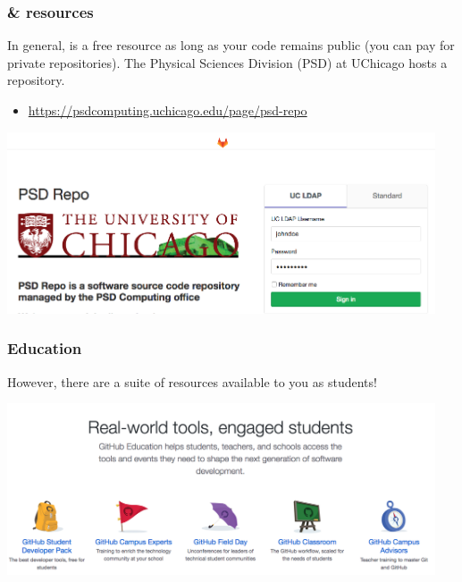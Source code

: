 \documentclass[hyperref={colorlinks=true}]{beamer}
\begin{document}

\begin{frame}%
  \frametitle{\github \& \gitlab resources }
  
  In general, \github is a free resource as long as your code remains public (you can pay for private repositories). The Physical Sciences Division (PSD) at UChicago hosts a  \gitlab repository.

  \begin{itemize}
    \item \url{https://psdcomputing.uchicago.edu/page/psd-repo}
  \end{itemize}
  
  \includegraphics[width=0.95\textwidth]{../Lecture1/PSDRepo.png}

\end{frame}



\begin{frame}%
  \frametitle{\github Education}
  
  However, there are a suite of resources available to you as students!
  
  \includegraphics[width=0.95\textwidth]{GitHubEducation.png}
  
  

\end{frame}
\end{document}
